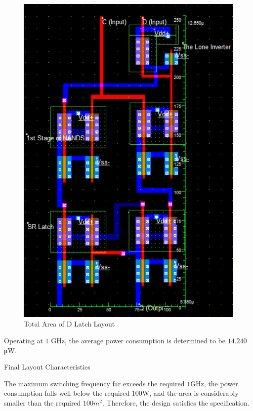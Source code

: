 \begin{figure}[h!]
	\centering
	\includegraphics[scale=0.70]{../images/dlatch_layout_area.PNG}
	\caption{Total Area of D Latch Layout}
	\label{fig:dlatch_area}
\end{figure}

\FloatBarrier

Operating at $1$ \si{\giga\hertz}, the average power consumption is determined to be $14.240$ \si{\micro\watt}.

\FloatBarrier

\begin{table}[h!]
	\centering
	\caption{Final Layout Characteristics}
	\label{tab:specs}
\end{table}

\FloatBarrier

The maximum switching frequency far exceeds the required $1$\si{\giga\hertz}, the power consumption falls well below the required $100$\si{\watt}, and the area is considerably smaller than the required $100m^2$. Therefore, the design satisfies the specification.
